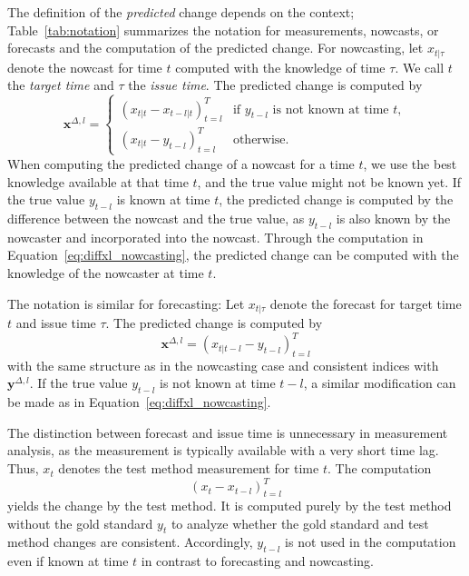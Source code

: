 \documentclass[pdflatex]{sn-jnl}
\theoremstyle{plain}%
\theoremstyle{definition}
\newcommand{\diffxl}{\mathbf{x}^{\Delta,l}}
\newcommand{\diffyl}{\mathbf{y}^{\Delta,l}}
\begin{document}
The definition of the \textit{predicted} change depends on the context;
Table~\ref{tab:notation} summarizes the notation for measurements, nowcasts, or forecasts and the computation of the predicted change.
For nowcasting, let $x_{t | \tau}$ denote the nowcast for time $t$ computed with the knowledge of time $\tau$.
We call $t$ the \textit{target time} and $\tau$ the \textit{issue time}.
The predicted change is computed by
\begin{equation}
  \diffxl =
\begin{cases}
(x_{t|t} - x_{t-l|t})^T_{t=l} & \text{if } y_{t-l} \text{ is not known at time } t, \\
(x_{t|t} - y_{t-l})^T_{t=l} & \text{otherwise}.
\end{cases} \label{eq:diffxl_nowcasting}
\end{equation}
When computing the predicted change of a nowcast for a time $t$, we use the best knowledge available at that time $t$, and the true value might not be known yet.
If the true value $y_{t-l}$ is known at time $t$, the predicted change is computed by the difference between the nowcast and the true value, as $y_{t-l}$ is also known by the nowcaster and incorporated into the nowcast.
Through the computation in Equation~\eqref{eq:diffxl_nowcasting}, the predicted change can be computed with the knowledge of the nowcaster at time $t$.

The notation is similar for forecasting: Let $x_{t | \tau}$ denote the forecast for target time $t$ and issue time $\tau$.
The predicted change is computed by
\begin{equation} \diffxl = (x_{t|t-l} - y_{t-l})^T_{t=l}\label{eq:diffxl_forecasting}
\end{equation}
with the same structure as in the nowcasting case and consistent indices with $\diffyl$.
If the true value $y_{t-l}$ is not known at time $t-l$, a similar modification can be made as in Equation~\eqref{eq:diffxl_nowcasting}.


The distinction between forecast and issue time is unnecessary in measurement analysis, as the measurement is typically available with a very short time lag.
Thus, $x_t$ denotes the test method measurement for time $t$.
The computation
\begin{equation}
  (x_{t} - x_{t-l})_{t=l}^T \label{eq:diffxl_measure}
\end{equation}
yields the change by the test method.
It is computed purely by the test method without the gold standard $y_t$ to analyze whether the gold standard and test method changes are consistent.
Accordingly, $y_{t-l}$ is not used in the computation even if known at time $t$ in contrast to forecasting and nowcasting.
\end{document}

